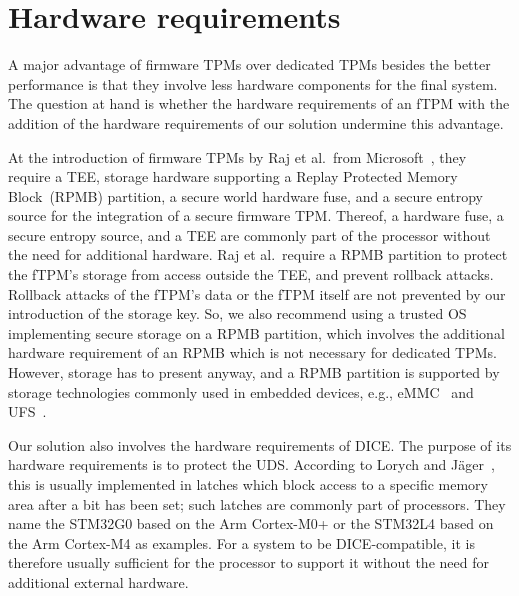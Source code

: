 \section{Hardware requirements}

A major advantage of firmware TPMs over dedicated TPMs besides the better performance is that they involve less hardware components for the final system.
The question at hand is whether the hardware requirements of an fTPM with the addition of the hardware requirements of our solution undermine this advantage.

At the introduction of firmware TPMs by Raj et al.\ from Microsoft~\cite{Raj2015}, they require a TEE, storage hardware supporting a Replay Protected Memory Block~(RPMB) partition, a secure world hardware fuse, and a secure entropy source for the integration of a secure firmware TPM\@.
Thereof, a hardware fuse, a secure entropy source, and a TEE are commonly part of the processor without the need for additional hardware.
Raj et al.\ require a RPMB partition to protect the fTPM's storage from access outside the TEE, and prevent rollback attacks.
Rollback attacks of the fTPM's data or the fTPM itself are not prevented by our introduction of the storage key.
So, we also recommend using a trusted OS implementing secure storage on a RPMB partition, which involves the additional hardware requirement of an RPMB which is not necessary for dedicated TPMs.
However, storage has to present anyway, and a RPMB partition is supported  by storage technologies commonly used in embedded devices, e.g., eMMC~\cite{eMMC} and UFS~\cite{UFS}.




Our solution also involves the hardware requirements of DICE\@.
The purpose of its hardware requirements is to protect the \ac{UDS}\@.
According to Lorych and Jäger~\cite{Lorych2022}, this is usually implemented in latches which block access to a specific memory area after a bit has been set; such latches are commonly part of processors.
They name the STM32G0 based on the Arm Cortex-M0+ or the STM32L4 based on the Arm Cortex-M4 as examples.
For a system to be DICE-compatible, it is therefore usually sufficient for the processor to support it without the need for additional external hardware.


